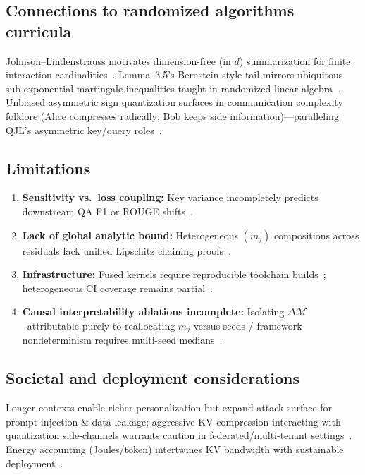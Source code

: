\documentclass[conference]{IEEEtran}
\begin{document}
\subsection{Connections to randomized algorithms curricula}

Johnson--Lindenstrauss motivates dimension-free (in $d$) summarization for finite interaction cardinalities~\cite{jl1984}. Lemma~3.5's Bernstein-style tail mirrors ubiquitous sub-exponential martingale inequalities taught in randomized linear algebra~\cite{woodruff2014}. Unbiased asymmetric sign quantization surfaces in communication complexity folklore (Alice compresses radically; Bob keeps side information)—paralleling QJL's asymmetric key/query roles~\cite{zandieh2024qjl}.

\subsection{Limitations}

\begin{enumerate}
\item \textbf{Sensitivity vs.\ loss coupling:} Key variance incompletely predicts downstream QA F1 or ROUGE shifts~\cite{bai2023longbench,presentation_mqjl}.
\item \textbf{Lack of global analytic bound:} Heterogeneous \((m_j)\) compositions across residuals lack unified Lipschitz chaining proofs~\cite{lipschitz2024}.
\item \textbf{Infrastructure:} Fused kernels require reproducible toolchain builds~\cite{qjlkernel}; heterogeneous CI coverage remains partial~\cite{zandieh2024aqjl-repo}.
\item \textbf{Causal interpretability ablations incomplete:} Isolating \(\Delta \mathcal{M}\)\ attributable purely to reallocating \(m_j\) versus seeds / framework nondeterminism requires multi-seed medians~\cite{presentation_mqjl}.
\end{enumerate}

\subsection{Societal and deployment considerations}

Longer contexts enable richer personalization but expand attack surface for prompt injection \& data leakage; aggressive KV compression interacting with quantization side-channels warrants caution in federated/multi-tenant settings~\cite{presentation_mqjl}. Energy accounting (Joules/token) intertwines KV bandwidth with sustainable deployment~\cite{presentation_mqjl}.
\end{document}
